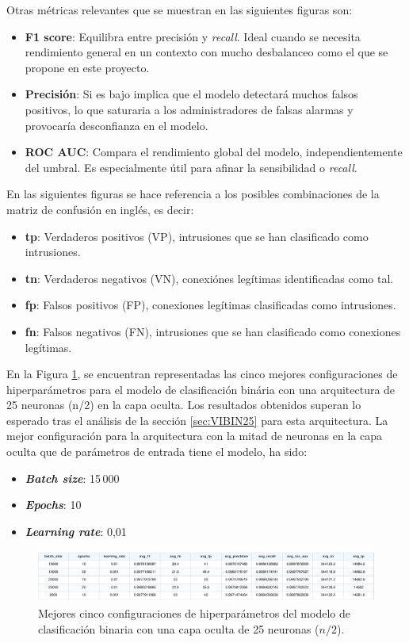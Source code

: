 Otras métricas relevantes que se muestran en las siguientes figuras son:
\begin{itemize}
	\item \textbf{F1 score}: Equilibra entre precisión y \textit{recall}. Ideal cuando se necesita rendimiento general en un contexto con mucho desbalanceo como el que se propone en este proyecto.
	\item \textbf{Precisión}: Si es bajo implica que el modelo detectará muchos falsos positivos, lo que saturaria a los administradores de falsas alarmas y provocaría desconfianza en el modelo.
	\item \textbf{ROC AUC}: Compara el rendimiento global del modelo, independientemente del umbral. Es especialmente útil para afinar la sensibilidad o \textit{recall}.
\end{itemize}

En las siguientes figuras se hace referencia a los posibles combinaciones de la matriz de confusión en inglés, es decir:
\begin{itemize}
	\item \textbf{tp}: Verdaderos positivos (VP), intrusiones que se han clasificado como intrusiones.
	\item \textbf{tn}: Verdaderos negativos (VN), conexiónes legítimas identificadas como tal.
	\item \textbf{fp}: Falsos positivos (FP), conexiones legítimas clasificadas como intrusiones.
	\item \textbf{fn}: Falsos negativos (FN), intrusiones que se han clasificado como conexiones legítimas.
\end{itemize}

En la Figura \ref{fig:BINhs25}, se encuentran representadas las cinco mejores configuraciones de hiperparámetros para el modelo de clasificación binária con una arquitectura de 25 neuronas (n/2) en la capa oculta. Los resultados obtenidos superan lo esperado tras el análisis de la sección \ref{sec:VIBIN25} para esta arquitectura. La mejor configuración para la arquitectura con la mitad de neuronas en la capa oculta que de parámetros de entrada tiene el modelo, ha sido:
\begin{itemize}
	\item \textbf{\textit{Batch size}}: 15\,000
	\item \textbf{\textit{Epochs}}: 10
	\item \textbf{\textit{Learning rate}}: 0,01
\end{itemize}

\begin{figure}[H]
    \centering
    \includegraphics[width=1\textwidth]{./img/modelo/BINhs25.pdf}
    \caption{Mejores cinco configuraciones de hiperparámetros del modelo de clasificación binaria con una capa oculta de 25 neuronas ($n/2$).}
    \label{fig:BINhs25}
\end{figure}



